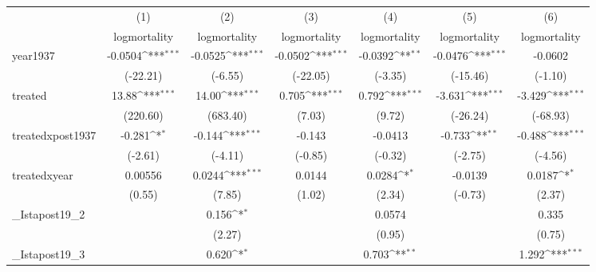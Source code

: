 {
\def\sym#1{\ifmmode^{#1}\else\(^{#1}\)\fi}
\begin{tabular}{l*{6}{c}}
\hline\hline
            &\multicolumn{1}{c}{(1)}&\multicolumn{1}{c}{(2)}&\multicolumn{1}{c}{(3)}&\multicolumn{1}{c}{(4)}&\multicolumn{1}{c}{(5)}&\multicolumn{1}{c}{(6)}\\
            &\multicolumn{1}{c}{logmortality}&\multicolumn{1}{c}{logmortality}&\multicolumn{1}{c}{logmortality}&\multicolumn{1}{c}{logmortality}&\multicolumn{1}{c}{logmortality}&\multicolumn{1}{c}{logmortality}\\
\hline
year1937    &     -0.0504\sym{***}&     -0.0525\sym{***}&     -0.0502\sym{***}&     -0.0392\sym{**} &     -0.0476\sym{***}&     -0.0602         \\
            &    (-22.21)         &     (-6.55)         &    (-22.05)         &     (-3.35)         &    (-15.46)         &     (-1.10)         \\
[1em]
treated     &       13.88\sym{***}&       14.00\sym{***}&       0.705\sym{***}&       0.792\sym{***}&      -3.631\sym{***}&      -3.429\sym{***}\\
            &    (220.60)         &    (683.40)         &      (7.03)         &      (9.72)         &    (-26.24)         &    (-68.93)         \\
[1em]
treatedxpost1937&      -0.281\sym{*}  &      -0.144\sym{***}&      -0.143         &     -0.0413         &      -0.733\sym{**} &      -0.488\sym{***}\\
            &     (-2.61)         &     (-4.11)         &     (-0.85)         &     (-0.32)         &     (-2.75)         &     (-4.56)         \\
[1em]
treatedxyear&     0.00556         &      0.0244\sym{***}&      0.0144         &      0.0284\sym{*}  &     -0.0139         &      0.0187\sym{*}  \\
            &      (0.55)         &      (7.85)         &      (1.02)         &      (2.34)         &     (-0.73)         &      (2.37)         \\
[1em]
\_Istapost19\_2&                     &       0.156\sym{*}  &                     &      0.0574         &                     &       0.335         \\
            &                     &      (2.27)         &                     &      (0.95)         &                     &      (0.75)         \\
[1em]
\_Istapost19\_3&                     &       0.620\sym{*}  &                     &       0.703\sym{**} &                     &       1.292\sym{***}\\

\end{tabular}}
